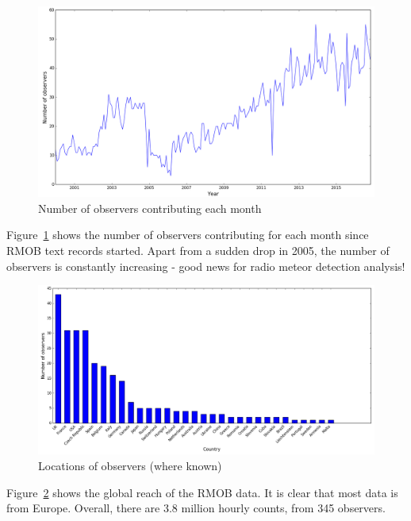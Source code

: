 \documentclass[landscape,a0paper,fontscale=0.400]{baposter} %
\begin{document}
\begin{poster}
{\begin{figure}
	\centering
	\includegraphics[width=\linewidth]{contributing_authors}
	\caption{Number of observers contributing each month
		\label{fig:contr}}
\end{figure}

Figure~\ref{fig:contr} shows the number of observers contributing for each month since RMOB text records started. Apart from a sudden drop in 2005, the number of observers is constantly increasing - good news for radio meteor detection analysis! \\
\vspace{2em}

\begin{figure}
	\centering
	\includegraphics[width=\linewidth]{locations}
	\caption{Locations of observers (where known)
		\label{fig:loc}}
\end{figure}

Figure~\ref{fig:loc} shows the global reach of the RMOB data. It is clear that most data is from Europe. Overall, there are 3.8 million hourly counts, from 345 observers.\\

}
\end{poster}
\end{document}
